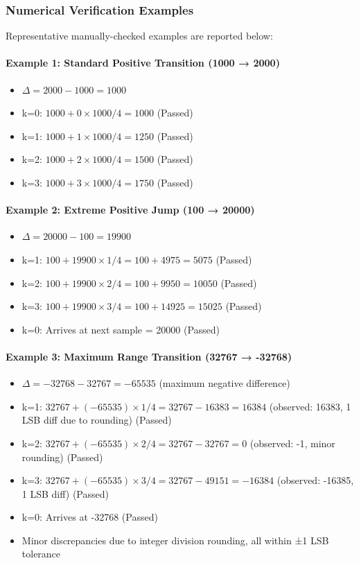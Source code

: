 \documentclass[a4paper,11pt]{article}
\begin{document}
\subsubsection{Numerical Verification Examples}

Representative manually-checked examples are reported below:

\paragraph{Example 1: Standard Positive Transition (1000 → 2000)}
\begin{itemize}
    \item $\Delta = 2000 - 1000 = 1000$
    \item k=0: $1000 + 0 \times 1000/4 = 1000$ (Passed)
    \item k=1: $1000 + 1 \times 1000/4 = 1250$ (Passed)
    \item k=2: $1000 + 2 \times 1000/4 = 1500$ (Passed)
    \item k=3: $1000 + 3 \times 1000/4 = 1750$ (Passed)
\end{itemize}

\paragraph{Example 2: Extreme Positive Jump (100 → 20000)}
\begin{itemize}
    \item $\Delta = 20000 - 100 = 19900$
    \item k=1: $100 + 19900 \times 1/4 = 100 + 4975 = 5075$ (Passed)
    \item k=2: $100 + 19900 \times 2/4 = 100 + 9950 = 10050$ (Passed)
    \item k=3: $100 + 19900 \times 3/4 = 100 + 14925 = 15025$ (Passed)
    \item k=0: Arrives at next sample = 20000 (Passed)
\end{itemize}

\paragraph{Example 3: Maximum Range Transition (32767 → -32768)}
\begin{itemize}
    \item $\Delta = -32768 - 32767 = -65535$ (maximum negative difference)
    \item k=1: $32767 + (-65535) \times 1/4 = 32767 - 16383 = 16384$ (observed: 16383, 1 LSB diff due to rounding) (Passed)
    \item k=2: $32767 + (-65535) \times 2/4 = 32767 - 32767 = 0$ (observed: -1, minor rounding) (Passed)
    \item k=3: $32767 + (-65535) \times 3/4 = 32767 - 49151 = -16384$ (observed: -16385, 1 LSB diff) (Passed)
    \item k=0: Arrives at -32768 (Passed)
    \item Minor discrepancies due to integer division rounding, all within ±1 LSB tolerance
\end{itemize}
\end{document}
